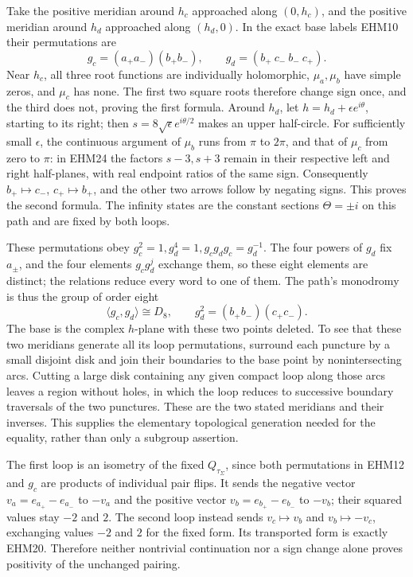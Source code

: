 \documentclass[
  10pt,
  a4paper,
]{article}
\newcounter{none} %
\begin{document}
Take the positive meridian around \(h_c\) approached along \((0,h_c)\),
and the positive meridian around \(h_d\) approached along \((h_d,0)\).
In the exact base labels EHM10 their permutations are \[
g_c=(a_+a_-)(b_+b_-),\qquad
g_d=(b_+\ c_-\ b_-\ c_+).
\tag{EHM25}
\] Near \(h_c\), all three root functions are individually holomorphic,
\(\mu_a,\mu_b\) have simple zeros, and \(\mu_c\) has none. The first two
square roots therefore change sign once, and the third does not, proving
the first formula. Around \(h_d\), let \(h=h_d+\epsilon e^{i\theta}\),
starting to its right; then \(s=8\sqrt\epsilon e^{i\theta/2}\) makes an
upper half-circle. For sufficiently small \(\epsilon\), the continuous
argument of \(\mu_b\) runs from \(\pi\) to \(2\pi\), and that of
\(\mu_c\) from zero to \(\pi\): in EHM24 the factors \(s-3,s+3\) remain
in their respective left and right half-planes, with real endpoint
ratios of the same sign. Consequently \(b_+\mapsto c_-\),
\(c_+\mapsto b_+\), and the other two arrows follow by negating signs.
This proves the second formula. The infinity states are the constant
sections \(\Theta=\pm i\) on this path and are fixed by both loops.

These permutations obey \(g_c^2=1,g_d^4=1,g_cg_dg_c=g_d^{-1}\). The four
powers of \(g_d\) fix \(a_\pm\), and the four elements \(g_cg_d^j\)
exchange them, so these eight elements are distinct; the relations
reduce every word to one of them. The path's monodromy is thus the group
of order eight \[
\langle g_c,g_d\rangle\cong D_8,
\qquad g_d^2=(b_+b_-)(c_+c_-).
\tag{EHM26}
\] The base is the complex \(h\)-plane with these two points deleted. To
see that these two meridians generate all its loop permutations,
surround each puncture by a small disjoint disk and join their
boundaries to the base point by nonintersecting arcs. Cutting a large
disk containing any given compact loop along those arcs leaves a region
without holes, in which the loop reduces to successive boundary
traversals of the two punctures. These are the two stated meridians and
their inverses. This supplies the elementary topological generation
needed for the equality, rather than only a subgroup assertion.

The first loop is an isometry of the fixed \(Q_{\tau_\Sigma}\), since
both permutations in EHM12 and \(g_c\) are products of individual pair
flips. It sends the negative vector \(v_a=e_{a_+}-e_{a_-}\) to \(-v_a\)
and the positive vector \(v_b=e_{b_+}-e_{b_-}\) to \(-v_b\); their
squared values stay \(-2\) and \(2\). The second loop instead sends
\(v_c\mapsto v_b\) and \(v_b\mapsto-v_c\), exchanging values \(-2\) and
\(2\) for the fixed form. Its transported form is exactly EHM20.
Therefore neither nontrivial continuation nor a sign change alone proves
positivity of the unchanged pairing.
\end{document}
